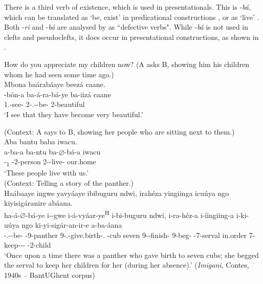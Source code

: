 \documentclass[output=paper]{langscibook}
\begin{document}
\z
\z

There is a third verb of existence, which is used in presentationals. This is -\textit{bá}, which can be translated as ‘be, exist’ in predicational constructions , or as ‘live’ . Both -\textit{ri} and -\textit{bá} are analysed by \citet[145]{Meeussen1959} as ``defective verbs". While -\textit{bá} is not used in clefts and pseudoclefts, it does occur in presentational constructions, as shown in .\largerpage[2]

\ea
\label{bkm:Ref75356327}
\begin{xlist}
  How do you appreciate my children now? (A asks B, showing him his children whom he had seen some time ago.)\\
Mbona baárabáaye beezá caane.\\
\gll
\N{}-bón-a  ba-á-ra-bá-ye  ba-iizá  caane\\
1\SG.\SM-{}see-\FV{}  2\SM-\RMT.\PST-\DJ-be-\PFV{}  2-beautiful  \INT{}\\
\glt
‘I see that they have become very beautiful.’\\
\end{xlist}

\ex
\label{bkm:Ref75356329}

(Context: A says to B, showing her people who are sitting next to them.)\\
Aba bantu baba iwacu.\\
\gll
a-ba-a  ba-ntu  ba-$\varnothing$-bá-a  iwacu\\
-\DEM{}\textsubscript{1}  \AUG-{}2-person  2\SM-\PRS{}-live-\FV{}  our.home\\
\glt
‘These people live with us.’\\
 
\ex
\label{bkm:Ref75253864}
(Context: Telling a story of the panther.)\\
Haábaaye ingwe yavyáaye ibibuguru ndwi, irahéza yingiinga icuúya ngo kiyisigáranire abáana.\\
\gll
ha-á-$\varnothing$-bá-ye  i-\N-{}gwe  i-á-vyáar-ye\textsuperscript{H}   i-bi-buguru  ndwi,  i-ra-héz-a  i-íingiing-a  i-ki-uúya   ngo  ki-yi-sigár-an-ir-e  a-ba-áana\\
\EXP-\RMT.\PST-\CJ{}-be-\PFV{}  \AUG{}-9-{}panther  9\SM-\RMT.\PST-{}give.birth-\PFV.\REL{}   -{}cub  seven  9\SM-\DJ-{}finish-\FV{}  {}9\SM{}-{}beg-\FV{}  \AUG{}-7-{}serval   in.order  7\OM-{}keep-\ASS{}-\APPL{}-\SBJ{}  \AUG{}-2-{}child\\
\glt
  ‘Once upon a time there was a panther who gave birth to seven cubs; she begged the serval to keep her children for her (during her absence).’ (\textit{Imigani}, Contes, 1940s – BantUGhent corpus)\\
\end{document}
